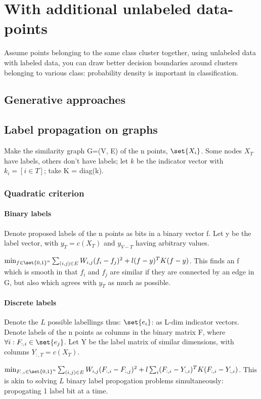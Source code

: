 \documentclass[oneside, article]{memoir}
\begin{document}
\chapter{With additional unlabeled data-points}
Assume points belonging to the same class cluster together, using unlabeled data with labeled data, you can draw better decision boundaries around clusters belonging to various class: probability density is important in classification.

\section{Generative approaches}
\tbc

\section{Label propagation on graphs}
Make the similarity graph G=(V, E) of the n points, $\set{X_i}$. Some nodes $X_T$ have labels, others don't have labels; let $k$ be the indicator vector with $k_i = [i \in T]$; take K = diag(k). 

\subsection{Quadratic criterion}
\subsubsection{Binary labels}
Denote proposed labels of the n points as bits in a binary vector f. Let y be the label vector, with $y_T = c(X_T)$ and $y_{V - T}$ having arbitrary values.

$\min_{f \in \set{0, 1}^{n}} \sum_{(i, j) \in E}W_{i, j}(f_i - f_j)^{2} + l(f-y)^{T}K(f-y)$. This finds an f which is smooth in that $f_i$ and $f_j$ are similar if they are connected by an edge in G, but also which agrees with $y_T$ as much as possible.

\subsubsection{Discrete labels}
Denote the $L$ possible labellings thus: $\set{e_i}$: as L-dim indicator vectors. Denote labels of the n points as columns in the binary matrix F, where $\forall i : F_{:,i} \in \set{e_j}$. Let Y be the label matrix of similar dimensions, with columns $Y_{:, T} = c(X_T)$.

$\min_{F_{:, i} \in \set{0, 1}^{n}} \sum_{(i, j) \in E}W_{i, j}(F_{:,i} - F_{:,j})^{2} + l\sum_i (F_{:,i}-Y_{:,i})^{T}K(F_{:,i}-Y_{:,i})$. This is akin to solving $L$ binary label propogation problems simultaneously: propogating 1 label bit at a time. 
\end{document}
